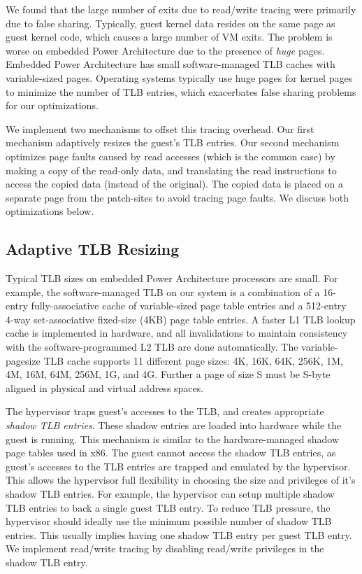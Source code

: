 \documentclass[10pt,twocolumn]{article}
\begin{document}
We found that the large number of exits due to read/write tracing were primarily
due to false sharing. Typically, guest kernel data resides on the same page as
guest kernel code, which causes a large number of VM exits. The problem is
worse on embedded Power Architecture due to the presence of {\em huge} pages.
Embedded Power Architecture has small software-managed
TLB caches with variable-sized pages. Operating systems typically use huge pages for
kernel pages to
minimize the number of TLB entries, which exacerbates false sharing problems for
our optimizations.

We implement two mechanisms to offset this tracing overhead. Our first mechanism
adaptively resizes the guest's TLB entries. Our second mechanism optimizes page faults
caused by read accesses (which is the common case) by making a copy of
the read-only data, and translating the read instructions
to access the copied data (instead of the original). The copied data is placed on
a separate page from the patch-sites to avoid tracing page faults. We discuss
both optimizations below.

\subsection{Adaptive TLB Resizing}
Typical TLB sizes on embedded Power Architecture processors are small.
For example, the software-managed TLB on our system is a combination of a 16-entry
fully-associative cache of variable-sized page table entries
and a 512-entry 4-way set-associative fixed-size (4KB) page table entries.
A faster L1 TLB lookup cache is implemented in hardware, and all invalidations
to maintain consistency with the software-programmed L2 TLB are done automatically.
The variable-pagesize TLB cache supports 11 different page sizes: 4K, 16K, 64K,
256K, 1M, 4M, 16M, 64M, 256M, 1G, and 4G. Further a page of size S must be S-byte
aligned in physical and virtual address spaces.

The hypervisor traps guest's accesses to the TLB, and creates appropriate
{\em shadow TLB entries}. These shadow entries are loaded into hardware
while the guest is
running. This mechanism is similar to the hardware-managed shadow page
tables used in x86\cite{agesen:comparison}. The guest cannot access the shadow
TLB entries, as guest's accesses to the TLB entries are trapped and emulated by
the hypervisor. This allows the hypervisor full flexibility in choosing the
size and privileges of it's shadow TLB entries. For example, the hypervisor
can setup multiple shadow TLB entries to back a single guest TLB entry.
To reduce TLB pressure, the hypervisor should ideally
use the minimum possible number of shadow TLB entries. This usually implies having
one shadow TLB entry per guest TLB entry. We implement read/write tracing by disabling
read/write privileges in the shadow TLB entry.
\end{document}
